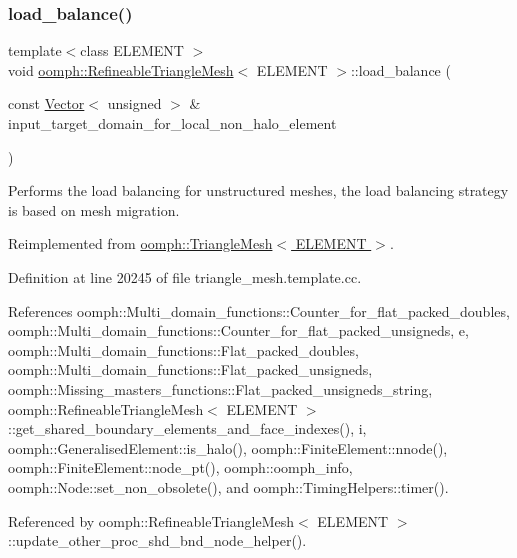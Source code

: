 \subsubsection{\texorpdfstring{load\+\_\+balance()}{load\_balance()}}
{\footnotesize\ttfamily template$<$class E\+L\+E\+M\+E\+NT $>$ \\
void \hyperlink{classoomph_1_1RefineableTriangleMesh}{oomph\+::\+Refineable\+Triangle\+Mesh}$<$ E\+L\+E\+M\+E\+NT $>$\+::load\+\_\+balance (\begin{DoxyParamCaption}\item[{const \hyperlink{classoomph_1_1Vector}{Vector}$<$ unsigned $>$ \&}]{input\+\_\+target\+\_\+domain\+\_\+for\+\_\+local\+\_\+non\+\_\+halo\+\_\+element }\end{DoxyParamCaption})\hspace{0.3cm}{\ttfamily [virtual]}}



Performs the load balancing for unstructured meshes, the load balancing strategy is based on mesh migration. 



Reimplemented from \hyperlink{classoomph_1_1TriangleMesh_a712bfd68d4b55e9c475347c0146fc8ac}{oomph\+::\+Triangle\+Mesh$<$ E\+L\+E\+M\+E\+N\+T $>$}.



Definition at line 20245 of file triangle\+\_\+mesh.\+template.\+cc.



References oomph\+::\+Multi\+\_\+domain\+\_\+functions\+::\+Counter\+\_\+for\+\_\+flat\+\_\+packed\+\_\+doubles, oomph\+::\+Multi\+\_\+domain\+\_\+functions\+::\+Counter\+\_\+for\+\_\+flat\+\_\+packed\+\_\+unsigneds, e, oomph\+::\+Multi\+\_\+domain\+\_\+functions\+::\+Flat\+\_\+packed\+\_\+doubles, oomph\+::\+Multi\+\_\+domain\+\_\+functions\+::\+Flat\+\_\+packed\+\_\+unsigneds, oomph\+::\+Missing\+\_\+masters\+\_\+functions\+::\+Flat\+\_\+packed\+\_\+unsigneds\+\_\+string, oomph\+::\+Refineable\+Triangle\+Mesh$<$ E\+L\+E\+M\+E\+N\+T $>$\+::get\+\_\+shared\+\_\+boundary\+\_\+elements\+\_\+and\+\_\+face\+\_\+indexes(), i, oomph\+::\+Generalised\+Element\+::is\+\_\+halo(), oomph\+::\+Finite\+Element\+::nnode(), oomph\+::\+Finite\+Element\+::node\+\_\+pt(), oomph\+::oomph\+\_\+info, oomph\+::\+Node\+::set\+\_\+non\+\_\+obsolete(), and oomph\+::\+Timing\+Helpers\+::timer().



Referenced by oomph\+::\+Refineable\+Triangle\+Mesh$<$ E\+L\+E\+M\+E\+N\+T $>$\+::update\+\_\+other\+\_\+proc\+\_\+shd\+\_\+bnd\+\_\+node\+\_\+helper().

